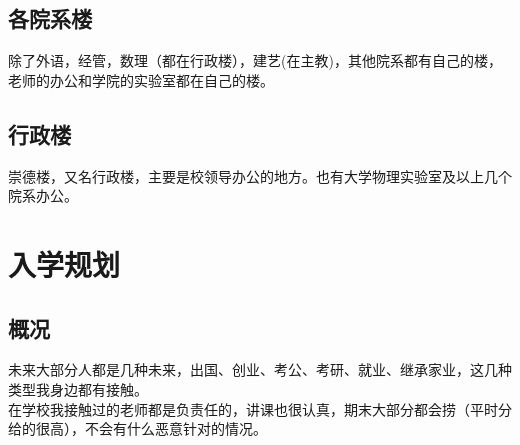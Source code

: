 \documentclass[12pt]{article} %
\begin{document}
	\subsection{各院系楼}
	除了外语，经管，数理（都在行政楼），建艺(在主教)，其他院系都有自己的楼，老师的办公和学院的实验室都在自己的楼。
	
		\subsection{行政楼}
	崇德楼，又名行政楼，主要是校领导办公的地方。也有大学物理实验室及以上几个院系办公。
	\newpage
		
	
	
	
	
	
	
	
	\section{入学规划} 
	\subsection{概况}
	未来大部分人都是几种未来，出国、创业、考公、考研、就业、继承家业，这几种类型我身边都有接触。\\
	
	在学校我接触过的老师都是负责任的，讲课也很认真，期末大部分都会捞（平时分给的很高），不会有什么恶意针对的情况。\\
	
\end{document}
